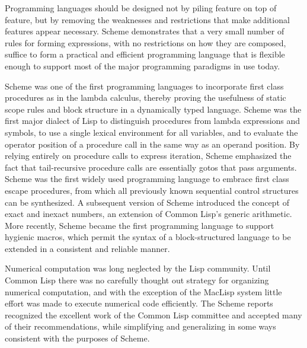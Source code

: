 
\label{historysection}

Programming languages should be designed not by piling feature on top of
feature, but by removing the weaknesses and restrictions that make additional
features appear necessary.  Scheme demonstrates that a very small number
of rules for forming expressions, with no restrictions on how they are
composed, suffice to form a practical and efficient programming language
that is flexible enough to support most of the major programming
paradigms in use today.

Scheme
was one of the first programming languages to incorporate first class
procedures as in the lambda calculus, thereby proving the usefulness of
static scope rules and block structure in a dynamically typed language.
Scheme was the first major dialect of Lisp to distinguish procedures
from lambda expressions and symbols, to use a single lexical
environment for all variables, and to evaluate the operator position
of a procedure call in the same way as an operand position.  By relying
entirely on procedure calls to express iteration, Scheme emphasized the
fact that tail-recursive procedure calls are essentially gotos that
pass arguments.  Scheme was the first widely used programming language to
embrace first class escape procedures, from which all previously known
sequential control structures can be synthesized.  A subsequent
version of Scheme introduced the concept of exact and inexact numbers,
an extension of Common Lisp's generic arithmetic.
More recently, Scheme became the first programming language to support
hygienic macros, which permit the syntax of a block-structured language
to be extended in a consistent and reliable manner.

Numerical computation was long neglected by the Lisp
community.  Until Common Lisp there was no carefully thought out
strategy for organizing numerical computation, and with the exception of
the MacLisp system \cite{Pitman83} little effort was made to
execute numerical code efficiently.
The Scheme reports recognized the excellent work
of the Common Lisp committee and accepted many of their recommendations,
while simplifying and generalizing in some ways
consistent with the purposes of Scheme.

